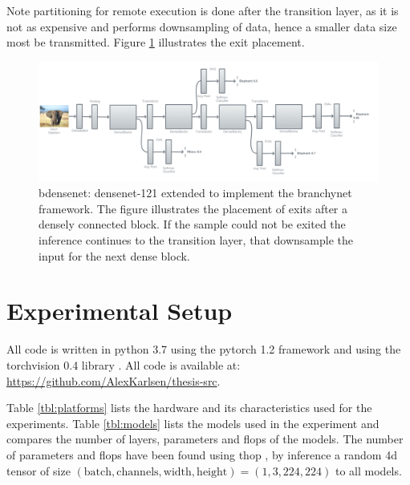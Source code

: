 Note partitioning for remote execution is done after the transition layer, as it is not as expensive and performs downsampling of data, hence a smaller data size most be transmitted. Figure \ref{fig:b-densenet} illustrates the exit placement.

\begin{figure}
	\centering
	\includegraphics[width=\linewidth]{figures/models/b-densenet}
	\caption[B-\gls{densenet} architecture]{\gls{bdensenet}: \gls{densenet}-121 extended to implement the \gls{branchynet} framework. The figure illustrates the placement of exits after a densely connected block. If the sample could not be exited the inference continues to the transition layer, that downsample the input for the next dense block. }
	\label{fig:b-densenet}
\end{figure}

\section{Experimental Setup} \label{sec:ee-exp-setup}

All code is written in \gls{python} 3.7 \cite{van_rossum_python_1995} using the \gls{pytorch} 1.2
framework \cite{paszke_automatic_2017} and using the \gls{torchvision} 0.4 library \cite{marcel_torchvision_2010}. All code is available at:
{\color{sns-grey}\url{https://github.com/AlexKarlsen/thesis-src}}. 

Table \ref{tbl:platforms} lists the hardware and its characteristics used for the experiments. Table \ref{tbl:models} lists the models used in the experiment and compares the number of layers, parameters and \gls{flop}s of the models. The number of parameters and \gls{flop}s have been found using \gls{thop} \cite{zhu_thop_nodate}, by inference a random 4d tensor of size $ (\mathrm{batch,channels,width,height})=(1,3,224,224) $ to all models.
 
